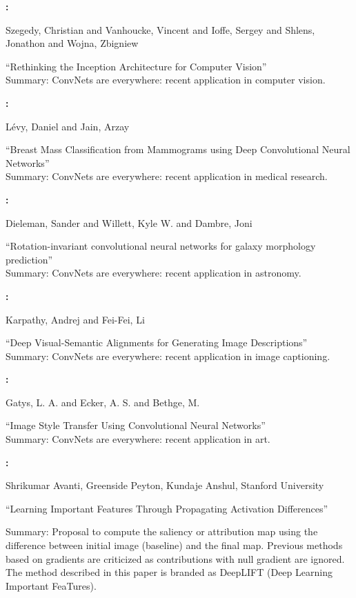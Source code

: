 \textbf{\cite{Szegedy2015}:}

Szegedy, Christian and Vanhoucke, Vincent and Ioffe, Sergey and Shlens, Jonathon and Wojna, Zbigniew

``Rethinking the Inception Architecture for Computer Vision''\\
Summary: ConvNets are everywhere: recent application in computer vision.



\textbf{\cite{Levy2016}:}

Lévy, Daniel and Jain, Arzay

``Breast Mass Classification from Mammograms using Deep Convolutional Neural Networks''\\
Summary: ConvNets are everywhere: recent application in medical research.



\textbf{\cite{Dieleman2014}:}

Dieleman, Sander and Willett, Kyle W. and Dambre, Joni

``Rotation-invariant convolutional neural networks for galaxy morphology prediction''\\
Summary: ConvNets are everywhere: recent application in astronomy.



\textbf{\cite{Karpathy2015}:} 

Karpathy, Andrej and Fei-Fei, Li

``Deep Visual-Semantic Alignments for Generating Image Descriptions''\\
Summary: ConvNets are everywhere: recent application in image captioning.



\textbf{\cite{Gatys2016}:} 

Gatys, L. A. and Ecker, A. S. and Bethge, M.

``Image Style Transfer Using Convolutional Neural Networks''\\
Summary: ConvNets are everywhere: recent application in art.




\textbf{\cite{Shrikumar2017}:} 

Shrikumar Avanti, Greenside Peyton, Kundaje Anshul, Stanford University

``Learning Important Features Through Propagating Activation Differences''

Summary: Proposal to compute the saliency or attribution map using the difference between initial image (baseline) and the final map. Previous methods based on gradients are criticized as contributions with null gradient are ignored. The method described in this paper is branded as DeepLIFT (Deep Learning Important FeaTures).



